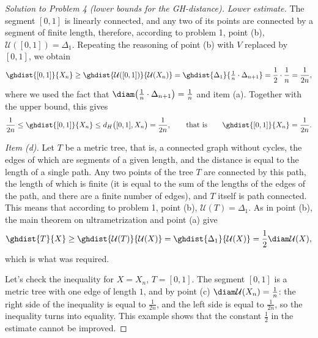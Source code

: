 \documentclass[a4paper,12pt]{report}
\begin{document}
\begin{proof}[Solution to Problem \textup{4} \textup{(}lower bounds for the GH-distance\textup{)}]
\textit{Lower estimate.} The segment $[0,1]$ is linearly connected, and any two of its points are connected by a segment of finite length, therefore, according to problem \textup{1}, point \textup{(b)}, $\mathcal U([0,1])=\Delta_1$. Repeating the reasoning of point \textup{(b)} with $V$ replaced by $[0,1]$, we obtain
\[
\ghdist{[0,1]}{X_n}\ge\ghdist{\mathcal U([0,1])}{\mathcal U(X_n)}=\ghdist{\Delta_1}{\tfrac1n\cdot\Delta_{n+1}}=\frac12\cdot\frac1n=\frac{1}{2n} ,
\]
where we used the fact that $\diam\bigl(\frac1n\cdot\Delta_{n+1}\bigr)=\frac1n$ and item \textup{(a)}. Together with the upper bound, this gives
\[
\frac{1}{2n}\le\ghdist{[0,1]}{X_n}\le d_H\bigl([0,1],X_n\bigr)=\frac{1}{2n},
\qquad\text{that is}\qquad \ghdist{[0,1]}{X_n}=\frac{1}{2n} .
\]

\textit{Item \textup{(d)}.} Let $T$ be a metric tree, that is, a connected graph without cycles, the edges of which are segments of a given length, and the distance is equal to the length of a single path. Any two points of the tree $T$ are connected by this path, the length of which is finite \textup{(}it is equal to the sum of the lengths of the edges of the path, and there are a finite number of edges\textup{)}, and $T$ itself is path connected. This means that according to problem \textup{1}, point \textup{(b)}, $\mathcal U(T)=\Delta_1$. As in point \textup{(b)}, the main theorem on ultrametrization and point \textup{(a)} give
\[
\ghdist{T}{X}\ge\ghdist{\mathcal U(T)}{\mathcal U(X)}=\ghdist{\Delta_1}{\mathcal U(X)}=\frac12\diam\mathcal U(X) ,
\]
which is what was required.

Let's check the inequality for $X=X_n$, $T=[0,1]$. The segment $[0,1]$ is a metric tree with one edge of length $1$, and by point \textup{(c)} $\diam\mathcal U(X_n)=\frac1n$\textup{:} the right side of the inequality is equal to $\frac{1}{2n}$, and the left side is equal to $\frac{1}{2n}$, so the inequality turns into equality. This example shows that the constant $\frac12$ in the estimate cannot be improved.

\end{proof}
\end{document}
